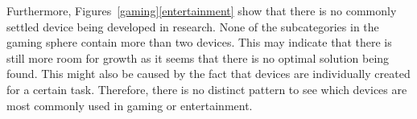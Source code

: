 Furthermore, Figures~\ref{gaming}\ref{entertainment} show that there is no commonly settled device being developed in research. None of the subcategories in the gaming sphere contain more than two devices. This may indicate that there is still more room for growth as it seems that there is no optimal solution being found. This might also be caused by the fact that devices are individually created for a certain task. Therefore, there is no distinct pattern to see which devices are most commonly used in gaming or entertainment.